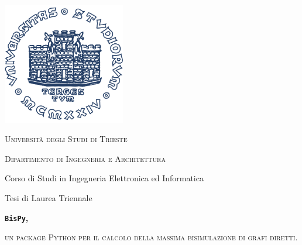 \documentclass[11pt]{article}
\numberwithin{equation}{section}
\theoremstyle{definition}
\theoremstyle{plain}
\begin{document}
\begin{titlepage}
  \begin{center}
      \vspace{-2cm}
      \includegraphics[width=0.4\textwidth]{logo}

      \vspace{1.5cm}

      \Large
      \textsc{Università degli Studi di Trieste}
      \makebox[\textwidth][c]{\rule{\textwidth}{.4pt}}

      \textsc{Dipartimento di Ingegneria e Architettura}

      \vspace{0.5cm}
      Corso di Studi in Ingegneria Elettronica ed Informatica

      \vspace{1.5cm}

      Tesi di Laurea Triennale

      \vspace{1.5cm}

      \makebox[\textwidth][c]{\rule{\textwidth}{.4pt}}
      \Large
      \textbf{\texttt{BisPy},}

      \large
      \textsc{un package Python per il calcolo della massima bisimulazione di grafi diretti.}
      \makebox[\textwidth][c]{\rule{\textwidth}{.4pt}}
      \vspace{1.5cm}

      \vfill

  \end{center}
\end{titlepage}

\renewcommand\contentsname{Indice}
\tableofcontents
{}


\clearpage

\clearpage

\clearpage

\clearpage

\clearpage

\renewcommand\refname{Bibliografia}


\end{document}
